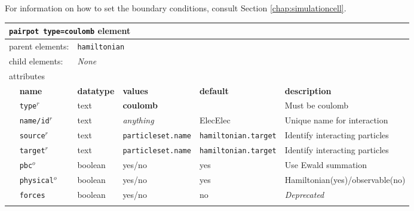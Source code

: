 For information on how to set the boundary conditions, consult Section \ref{chap:simulationcell}.


\FloatBarrier
\begin{table}[h]
\begin{center}
\begin{tabularx}{\textwidth}{l l l l l X }
\hline
\multicolumn{6}{l}{\texttt{pairpot type=coulomb} element} \\
\hline
\multicolumn{2}{l}{parent elements:} & \multicolumn{4}{l}{\texttt{hamiltonian}}\\
\multicolumn{2}{l}{child  elements:} & \multicolumn{4}{l}{\textit{None}}\\
\multicolumn{2}{l}{attributes}  & \multicolumn{4}{l}{}\\
   &   \bfseries name     & \bfseries datatype & \bfseries values & \bfseries default   & \bfseries description \\
   & \texttt{type}$^r$    &  text              & \textbf{coulomb} &                     & Must be coulomb     \\
   & \texttt{name/id}$^r$ &  text              & \textit{anything}&  ElecElec           & Unique name for interaction\\
   & \texttt{source}$^r$  &  text              & \texttt{particleset.name} &\texttt{hamiltonian.target}& Identify interacting particles\\
   & \texttt{target}$^r$  &  text              & \texttt{particleset.name} &\texttt{hamiltonian.target}& Identify interacting particles\\
   & \texttt{pbc}$^o$     &  boolean           & yes/no           & yes                 & Use Ewald summation  \\
   & \texttt{physical}$^o$&  boolean           & yes/no           & yes                 & Hamiltonian(yes)/observable(no) \\
\dev{& \texttt{forces}      &  boolean           & yes/no           & no                  & \textit{Deprecated}             \\ }
  \hline
\end{tabularx}
\end{center}
\end{table}
\FloatBarrier

